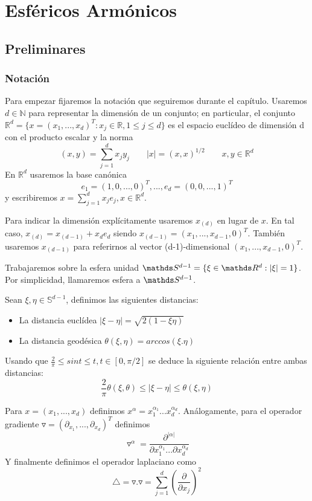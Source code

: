 \chapter[Esféricos Armónicos]
        {Esféricos Armónicos}
\section{Preliminares}
\subsection{Notación}
Para empezar fijaremos la notación que seguiremos durante el capítulo. Usaremos $d\in\mathds{N}$ para representar la dimensión de un conjunto; en particular, el conjunto $\mathds{R}^d = \{x=(x_1,...,x_d)^T : x_j\in\mathds{R},1 \le j \le d\}$ es el espacio euclídeo de dimensión d con el producto escalar y la norma
$$
(x,y) = \sum_{j=1}^{d} x_jy_j  \qquad |x|=(x,x)^{1/2}  \qquad x,y\in\mathds{R}^d
$$
En $\mathds{R}^d$ usaremos la base canónica
$$
e_1=(1,0,...,0)^T, ..., e_d=(0,0,...,1)^T
$$
y escribiremos $x = \sum_{j=1}^{d} x_je_j, x\in\mathds{R}^d$.
\medskip

Para indicar la dimensión explícitamente usaremos $x_{(d)}$ en lugar de $x$. En tal caso, $x_{(d)} = x_{(d-1)}+x_de_d$ siendo $x_{(d-1)}=(x_1,...,x_{d-1},0)^T$. También usaremos $x_{(d-1)}$ para referirnos al vector (d-1)-dimensional $(x_1,...,x_{d-1},0)^T$.
\medskip

Trabajaremos sobre la esfera unidad $\sphere = \{\xi\in\R : |\xi| = 1\}$. Por simplicidad, llamaremos esfera a $\sphere$.
\begin{defn} Sean $\xi,\eta\in\mathds{S}^{d-1}$, definimos las siguientes distancias:
	\begin{itemize}
		\item La distancia euclídea $|\xi-\eta| = \sqrt{2(1-\xi\eta)}$
		\item La distancia geodésica $\theta(\xi,\eta)=arccos(\xi.\eta)$
	\end{itemize}	
\end{defn}

\begin{rem}Usando que $\frac{2}{\pi} \le sin t \le t,       t\in[0,\pi/2]$ se deduce la siguiente relación entre ambas distancias:
	$$
	\frac{2}{\pi}\theta(\xi,\theta) \le |\xi - \eta| \le \theta(\xi,\eta)
	$$ 
\end{rem}

Para $x =(x_1,...,x_d)$ definimos $x^\alpha = x_1^{\alpha_1}...x_d^{\alpha_d}$. Análogamente,
para el operador gradiente $\triangledown = (\partial_{x_1},...,\partial_{x_d})^T$ definimos
$$
	\triangledown^\alpha = \frac{\partial^{|\alpha|}}{\partial x_1^{\alpha_1}...\partial x_d^{\alpha_d}}
$$
Y finalmente definimos el operador laplaciano como
$$
	\triangle = \triangledown.\triangledown = \sum_{j=1}^{d}(\frac{\partial}{\partial x_j})^2
$$


